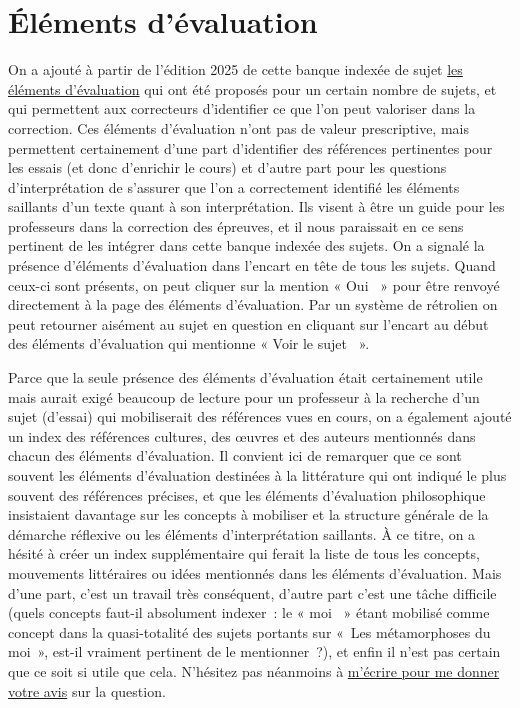 \section*{Éléments d'évaluation}

On a ajouté à partir de l'édition 2025 de cette banque indexée de sujet \hyperlink{corrections}{les éléments d'évaluation} qui ont été proposés pour un certain nombre de sujets, et qui permettent aux correcteurs d'identifier ce que l'on peut valoriser dans la correction. Ces éléments d'évaluation n'ont pas de valeur prescriptive, mais permettent certainement d'une part d'identifier des références pertinentes pour les essais (et donc d'enrichir le cours) et d'autre part pour les questions d'interprétation de s'assurer que l'on a correctement identifié les éléments saillants d'un texte quant à son interprétation. Ils visent à être un guide pour les professeurs dans la correction des épreuves, et il nous paraissait en ce sens pertinent de les intégrer dans cette banque indexée des sujets. On a signalé la présence d'éléments d'évaluation dans l'encart en tête de tous les sujets. Quand ceux-ci sont présents, on peut cliquer sur la mention « Oui ~»{} pour être renvoyé directement à la page des éléments d'évaluation. Par un système de rétrolien on peut retourner aisément au sujet en question en cliquant sur l'encart au début des éléments d'évaluation qui mentionne « Voir le sujet ~»{}.

Parce que la seule présence des éléments d'évaluation était certainement utile mais aurait exigé beaucoup de lecture pour un professeur à la recherche d'un sujet (d'essai) qui mobiliserait des références vues en cours, on a également ajouté un index des références cultures, des œuvres et des auteurs mentionnés dans chacun des éléments d'évaluation. Il convient ici de remarquer que ce sont souvent les éléments d'évaluation destinées à la littérature qui ont indiqué le plus souvent des références précises, et que les éléments d'évaluation philosophique insistaient davantage sur les concepts à mobiliser et la structure générale de la démarche réflexive ou les éléments d'interprétation saillants. À ce titre, on a hésité à créer un index supplémentaire qui ferait la liste de tous les concepts, mouvements littéraires ou idées mentionnés dans les éléments d'évaluation. Mais d'une part, c'est un travail très conséquent, d'autre part c'est une tâche difficile (quels concepts faut-il absolument indexer~: le « moi ~»{} étant mobilisé comme concept dans la quasi-totalité des sujets portants sur «~Les métamorphoses du moi~»{}, est-il vraiment pertinent de le mentionner~?), et enfin il n'est pas certain que ce soit si utile que cela. N'hésitez pas néanmoins à \href{mailto:mikael.quesseveur@ac-lille.fr}{m'écrire pour me donner votre avis} sur la question.

